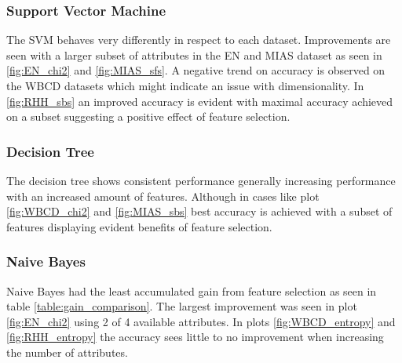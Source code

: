 

\subsubsection{Support Vector Machine}

The SVM behaves very differently in respect to each dataset. Improvements are seen with a larger subset of attributes in the EN and MIAS dataset as seen in \ref{fig:EN_chi2} and \ref{fig:MIAS_sfs}. A negative trend on accuracy is observed on the WBCD datasets which might indicate an issue with dimensionality. In \ref{fig:RHH_sbs} an improved accuracy is evident with maximal accuracy achieved on a subset suggesting a positive effect of feature selection.



\subsubsection{Decision Tree}

The decision tree shows consistent performance generally increasing performance with an increased amount of features. Although in cases like plot \ref{fig:WBCD_chi2} and \ref{fig:MIAS_sbs} best accuracy is achieved with a subset of features displaying evident benefits of feature selection.



\subsubsection{Naive Bayes}

Naive Bayes had the least accumulated gain from feature selection as seen in table \ref{table:gain_comparison}. The largest improvement was seen in plot \ref{fig:EN_chi2} using 2 of 4 available attributes. In plots \ref{fig:WBCD_entropy} and \ref{fig:RHH_entropy} the accuracy sees little to no improvement when increasing the number of attributes.



